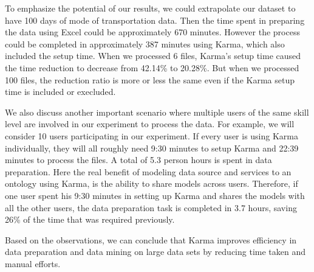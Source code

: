 To emphasize the potential of our results, we could extrapolate our dataset to have 100 days of mode of transportation data. Then the time spent in preparing the data using Excel could be approximately 670 minutes. However the process could be completed in approximately 387 minutes using Karma, which also included the setup time. When we processed 6 files, Karma's setup time caused the time reduction to decrease from 42.14\% to 20.28\%. But when we processed 100 files, the reduction ratio is more or less the same even if the Karma setup time is included or execluded. 

We also discuss another important scenario where multiple users of the same skill level are involved in our experiment to process the data. For example, we will consider 10 users participating in our experiment. If every user is using Karma individually, they will all roughly need 9:30 minutes to setup Karma and 22:39 minutes to process the files. A total of 5.3 person hours is spent in data preparation. Here the real benefit of modeling data source and services to an ontology using Karma, is the ability to share models across users. Therefore, if one user spent his 9:30 minutes in setting up Karma and shares the models with all the other users, the data preparation task is completed in 3.7 hours, saving 26\% of the time that was required previously. 

Based on the observations, we can conclude that Karma improves efficiency in data preparation and data mining on large data sets by reducing time taken and manual efforts.



